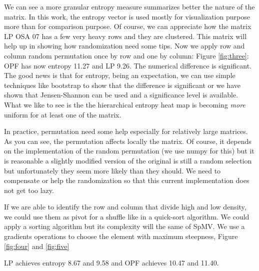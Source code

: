 \documentclass[manuscript,screen]{acmart}
\begin{document}

We can see a more granular entropy measure summarizes better the
nature of the matrix. In this work, the entropy vector is used mostly
for visualization purpose more than for comparison purpose. Of course,
we can appreciate how the matrix LP OSA 07 has a few very heavy rows
and they are clustered. This matrix will help up in showing how
randomization need some tips. Now we apply row and column random
permutation once by row and one by column: Figure \ref{fig:three}: OPF
has now entropy 11.27 and LP 9.26. The numerical difference is
significant. The good news is that for entropy, being an expectation,
we can use simple techniques like bootstrap to show that the
difference is significant or we have shown that Jensen-Shannon can be
used and a significance level is available. What we like to see is the
the hierarchical entropy heat map is becoming {\em more} uniform for
at least one of the matrix.


In practice, permutation need some help especially for relatively
large matrices. As you can see, the permutation affects locally the
matrix. Of course, it depends on the implementation of the random
permutation (we use numpy for this) but it is reasonable a slightly
modified version of the original is still a random selection but
unfortunately they seem more likely than they should. We need to
compensate or help the randomization so that this current
implementation does not get too lazy.

If we are able to identify the row and column that divide high and low
density, we could use them as pivot for a shuffle like in a quick-sort
algorithm. We could apply a sorting algorithm but its complexity will
the same of SpMV. We use a gradients operations to choose the element
with maximum steepness, Figure \ref{fig:four} and \ref{fig:five}

LP achieves entropy 8.67 and 9.58 and OPF achieves 10.47 and 11.40.

\end{document}
